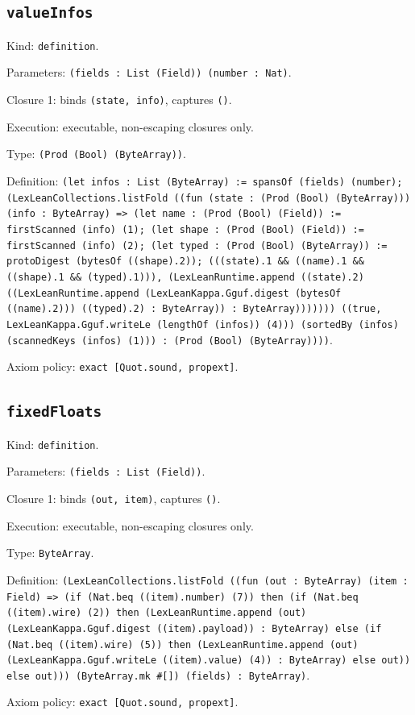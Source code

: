 \documentclass[11pt]{article}
\begin{document}
\subsection*{\texttt{valueInfos}}
\noindent Kind: \texttt{definition}.\par
\noindent Parameters: \texttt{(fields : List (Field)) (number : Nat)}.\par
\noindent Closure 1: binds \texttt{(state, info)}, captures \texttt{()}.\par
\noindent Execution: executable, non-escaping closures only.\par
\noindent Type: \texttt{(Prod (Bool) (ByteArray))}.\par
\noindent Definition: \texttt{(let infos : List (ByteArray) := spansOf (fields) (number); (LexLeanCollections.listFold ((fun (state : (Prod (Bool) (ByteArray))) (info : ByteArray) => (let name : (Prod (Bool) (Field)) := firstScanned (info) (1); (let shape : (Prod (Bool) (Field)) := firstScanned (info) (2); (let typed : (Prod (Bool) (ByteArray)) := protoDigest (bytesOf ((shape).2)); (((state).1 \&\& ((name).1 \&\& ((shape).1 \&\& (typed).1))), (LexLeanRuntime.append ((state).2) ((LexLeanRuntime.append (LexLeanKappa.Gguf.digest (bytesOf ((name).2))) ((typed).2) : ByteArray)) : ByteArray))))))) ((true, LexLeanKappa.Gguf.writeLe (lengthOf (infos)) (4))) (sortedBy (infos) (scannedKeys (infos) (1))) : (Prod (Bool) (ByteArray))))}.\par
\noindent Axiom policy: \texttt{exact [Quot.sound, propext]}.\par
\subsection*{\texttt{fixedFloats}}
\noindent Kind: \texttt{definition}.\par
\noindent Parameters: \texttt{(fields : List (Field))}.\par
\noindent Closure 1: binds \texttt{(out, item)}, captures \texttt{()}.\par
\noindent Execution: executable, non-escaping closures only.\par
\noindent Type: \texttt{ByteArray}.\par
\noindent Definition: \texttt{(LexLeanCollections.listFold ((fun (out : ByteArray) (item : Field) => (if (Nat.beq ((item).number) (7)) then (if (Nat.beq ((item).wire) (2)) then (LexLeanRuntime.append (out) (LexLeanKappa.Gguf.digest ((item).payload)) : ByteArray) else (if (Nat.beq ((item).wire) (5)) then (LexLeanRuntime.append (out) (LexLeanKappa.Gguf.writeLe ((item).value) (4)) : ByteArray) else out)) else out))) (ByteArray.mk \#[]) (fields) : ByteArray)}.\par
\noindent Axiom policy: \texttt{exact [Quot.sound, propext]}.\par
\end{document}
